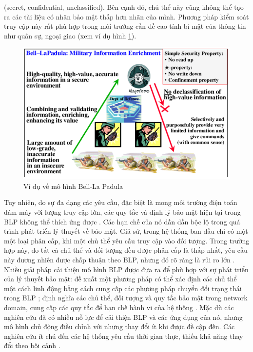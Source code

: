 (secret, confidential, unclassified). Bên cạnh đó, chủ thể này cũng không thể tạo ra các
tài liệu có nhãn bảo mật thấp hơn nhãn của mình. Phương pháp kiểm soát truy cập này rất phù hợp trong môi trường cần đề cao tính bí mật của thông tin như quân sự, ngoại
giao (xem ví dụ hình \ref{fig:chap2-blp-model}).
\begin{figure}
    \centering
    \includegraphics[scale=0.6]{graphics/chapter-2/chap2-blp-model.png}
    \caption{Ví dụ về mô hình Bell-La Padula}
    \label{fig:chap2-blp-model}
\end{figure}
Tuy nhiên, do sự đa dạng các yêu cầu, đặc biệt là mong môi trường điện toán đám
mây với lượng truy cập lớn, các quy tắc và định lý bảo mật hiện tại trong BLP không thể
thích ứng được \cite{tang2018self}.  Các hạn chế của nó dần dần bộc lộ trong quá trình phát triển lý
thuyết về bảo mật.
Giả sử, trong hệ thống ban đầu chỉ có một một loại phân cấp, khi một chủ thể yêu
cầu truy cập vào đối tượng. Trong trường hợp này, do tất cả chủ thể và đối tượng đều
được phân cấp là thấp nhất, yêu cầu này đương nhiên được chấp thuận theo BLP, nhưng
đó rõ ràng là rủi ro lớn \cite{mclean1990security}. \\
\indent Nhiều giải pháp cải thiện mô hình BLP được đưa ra để phù hợp với sự phát triển
của lý thuyết bảo mật: đề xuất một phương pháp có thể xác định các chủ thể một cách
linh động bằng cách cung cấp các phương pháp chuyển đổi trạng thái trong BLP \cite{zhu2016application}; định nghĩa các chủ thể, đối tượng và quy tắc bảo mật trong network domain, cung cấp
các quy tắc để hạn chế hành vi của hệ thống \cite{ou2009research}. 
\indent Mặc dù các nghiên cứu đã có nhiều nỗ lực để cải thiện BLP và các ứng dụng của
nó, nhưng mô hình chủ động điều chỉnh với những thay đổi ít khi được đề cập đến. Các
nghiên cứu ít chú đến các hệ thống yêu cầu thời gian thực, thiếu khả năng thay đổi theo
bối cảnh \cite{yang2019using}.
